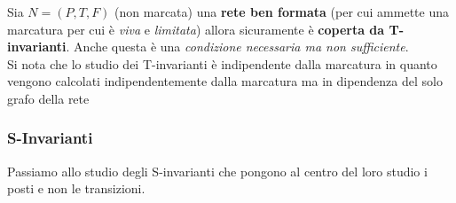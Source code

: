 \documentclass[a4paper,12pt, oneside]{book}
\begin{document}
\begin{teorema}
  Sia $N=(P,T,F)$ (non marcata) una \textbf{rete ben formata} (per cui ammette
  una marcatura per cui è \emph{viva} e \emph{limitata}) allora sicuramente è
  \textbf{coperta da T-invarianti}. Anche questa è una \emph{condizione
    necessaria ma non sufficiente}.\\
  Si nota che lo studio dei T-invarianti è indipendente dalla marcatura in
  quanto vengono calcolati indipendentemente dalla marcatura ma in dipendenza
  del solo grafo della rete
\end{teorema}
\subsubsection{S-Invarianti}
Passiamo allo studio degli S-invarianti che pongono al centro del loro studio i
posti e non le transizioni.\\
\end{document}
